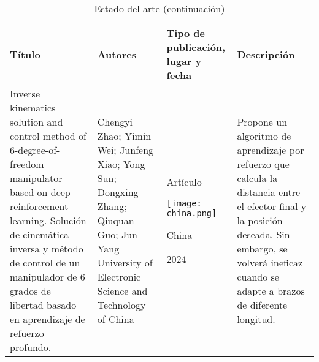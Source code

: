 \newpage
\begin{table}[htb]
	\caption{Estado del arte (continuación)}
	\centering
	\begin{tabular}{p{3.8cm}p{3.8cm}p{3.8cm}p{3.8cm}}
		\textbf{Título} & \textbf{Autores} & \textbf{Tipo de publicación, lugar y fecha} & \textbf{Descripción} \\ 
		\midrule
		Inverse kinematics solution and control method of 6-degree-of-freedom manipulator based on deep reinforcement learning. \newline\newline
		Solución de cinemática inversa y método de control de un manipulador de 6 grados de libertad basado en aprendizaje de refuerzo profundo. &  
		Chengyi Zhao; Yimin Wei; Junfeng Xiao; Yong Sun; Dongxing Zhang; Qiuquan Guo; Jun Yang \newline\newline 
		University of Electronic Science and Technology of China & 
		\begin{center}Artículo \par \texttt{[image: china.png]} \par China \par 2024\end{center} & 
		Propone un algoritmo de aprendizaje por refuerzo que calcula la distancia entre el efector final y la posición deseada. \newline\newline Sin embargo, se volverá ineficaz cuando se adapte a brazos de diferente longitud. \\
	\end{tabular}
\end{table}